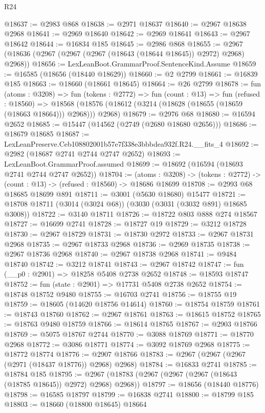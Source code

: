 \begin{lexlean}{R24}
\begin{coremodule}
@18637 := @2983 @868
@18638 := @2971 @18637
@18640 := @2967 @18638 @2968
@18641 := @2969 @18640
@18642 := @2969 @18641
@18643 := @2967 @18642
@18644 := @16834 @185
@18645 := @2986 @868
@18655 := @2967 (@18636 (@2967 (@2967 (@2967 (@18643 (@18644 @18645)) @2972) @2968) @2968))
@18656 := LexLeanBoot.GrammarProof.SentenceKind.Assume
@18659 := @16585 (@18656 (@18440 @18629))
@18660 := @2 @2799
@18661 := @16839 @185
@18663 := @18660 (@18661 @18645)
@18664 := @26 @2799
@18678 := fun (atoms : @3208) =>
  fun (tokens : @2772) =>
  fun (count : @13) =>
  fun (refused : @18560) =>
  @18568 (@18576 (@18612 (@3214 (@18628 (@18655 (@18659 (@18663 @18664))) @2968))) @2968)
@18679 := @2976 @68
@18680 := @16594 @2652
@18685 := @15447 (@14562 (@2749 (@2680 @18680 @2656)))
@18686 := @18679 @18685
@18687 := LexLeanPreserve.Ceb108802001b57e7f338e3bbbdea932f.R24.__fits_4
@18692 := @2982 (@18687 @2741 @2744 @2747 @2652)
@18693 := LexLeanBoot.GrammarProof.assumed
@18699 := @18692 (@16594 (@18693 @2741 @2744 @2747 @2652))
@18704 := (atoms : @3208) ->
  (tokens : @2772) -> (count : @13) -> (refused : @18560) -> @18686 @18699
@18708 := @2993 @68 @18685 @18699 @891
@18711 := @3001 (@5630 @18680) @15477
@18721 := @18708 @18711 (@3014 (@3024 @68)) (@3030 (@3031 (@3032 @891) @18685 @3008))
@18722 := @3140 @18711
@18726 := @18722 @803 @888 @274 @18567
@18727 := @16699 @2741
@18728 := @18727 @19
@18729 := @3212 @18728
@18730 := @2967 @18729
@18731 := @18730 @2972
@18733 := @2967 @18731 @2968
@18735 := @2967 @18733 @2968
@18736 := @2969 @18735
@18738 := @2967 @18736 @2968
@18740 := @2967 @18738 @2968
@18741 := @9484 @18740
@18742 := @3212 @18741
@18743 := @2967 @18742
@18747 := fun (__p0 : @2901) => @18258 @5408 @2738 @2652
@18748 := @18593 @18747
@18752 := fun (state : @2901) => @17731 @5408 @2738 @2652
@18754 := @18748 @18752 @9480
@18755 := @16703 @2741
@18756 := @18755 @19
@18759 := @18605 (@14620 @18756 @14614)
@18760 := @18754 @18759
@18761 := @18743 @18760
@18762 := @2967 @18761
@18763 := @18615 @18752
@18765 := @18763 @9480 @18759
@18766 := @18614 @18765
@18767 := @2903 @18766
@18769 := @5075 @18767 @2744
@18770 := @3088 @18769
@18771 := @18770 @2968
@18772 := @3086 @18771
@18774 := @3092 @18769 @2968
@18775 := @18772 @18774
@18776 := @2907 @18766
@18783 := @2967 (@2967 (@2967 (@2971 (@18437 @18776)) @2968) @2968)
@18784 := @16833 @2741
@18785 := @18784 @185
@18795 := @2967 (@18783 (@2967 (@2967 (@2967 (@18643 (@18785 @18645)) @2972) @2968) @2968))
@18797 := @18656 (@18440 @18776)
@18798 := @16585 @18797
@18799 := @16838 @2741
@18800 := @18799 @185
@18803 := @18660 (@18800 @18645) @18664

\end{coremodule}
\end{lexlean}
